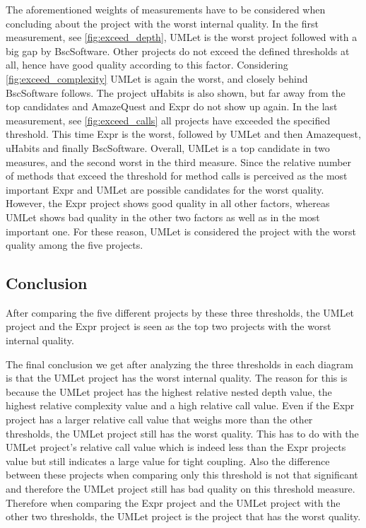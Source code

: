 \documentclass[conference]{IEEEtran}
\begin{document}
The aforementioned weights of measurements have to be considered when concluding about the project with the worst internal quality. In the first measurement, see \cref{fig:exceed_depth}, UMLet is the worst project followed with a big gap by BscSoftware. Other projects do not exceed the defined thresholds at all, hence have good quality according to this factor. Considering \cref{fig:exceed_complexity} UMLet is again the worst, and closely behind BscSoftware follows. The project uHabits is also shown, but far away from the top candidates and AmazeQuest and Expr do not show up again. In the last measurement, see \cref{fig:exceed_calls} all projects have exceeded the specified threshold. This time Expr is the worst, followed by UMLet and then Amazequest, uHabits and finally BscSoftware. Overall, UMLet is a top candidate in two measures, and the second worst in the third measure. Since the relative number of methods that exceed the threshold for method calls is perceived as the most important Expr and UMLet are possible candidates for the worst quality. However, the Expr project shows good quality in all other factors, whereas UMLet shows bad quality in the other two factors as well as in the most important one. For these reason, UMLet is considered the project with the worst quality among the five projects.





\subsection{Conclusion}
After comparing the five different projects by these three thresholds, the UMLet project and the Expr project is seen as the top two projects with the worst internal quality. 

The final conclusion we get after analyzing the three thresholds in each diagram is that the UMLet project has the worst internal quality. The reason for this is because the UMLet project has the highest relative nested depth value, the highest relative complexity value and a high relative call value. Even if the Expr project has a larger relative call value that weighs more than the other thresholds, the UMLet project still has the worst quality. This has to do with the UMLet project's relative call value which is indeed less than the Expr projects value but still indicates a large value for tight coupling. Also the difference between these projects when comparing only this threshold is not that significant and therefore the UMLet project still has bad quality on this threshold measure. Therefore when comparing the Expr project and the UMLet project with the other two thresholds, the UMLet project is the project that has the worst quality. 
\end{document}
